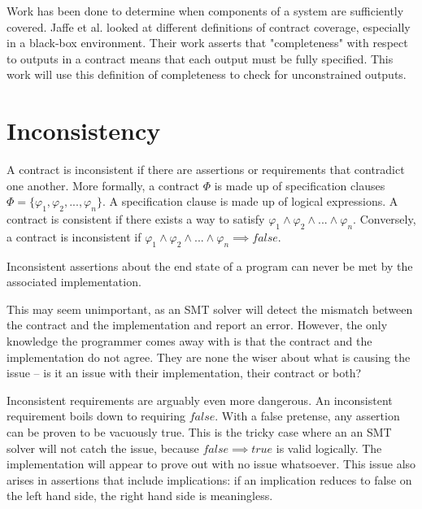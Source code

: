 \documentclass{article}
\newif\ifcomments
\newcommand{\egm}[1]{\ifcomments\textcolor{orange}{egm: #1}\fi}
\begin{document}
Work has been done to determine when components of a system are sufficiently covered. Jaffe et al. \cite{jaffe1989completeness}
looked at different definitions of contract coverage, especially in a black-box environment. Their work asserts that "completeness"
with respect to outputs in a contract means that each output must be fully specified. This work will use this definition of
completeness to check for unconstrained outputs.

\section{Inconsistency}

A contract is inconsistent if there are assertions or requirements that contradict one another. More formally, a
contract \(\Phi\) is made up of specification clauses \(\Phi = \{\varphi_{1}, \varphi_{2}, ..., \varphi_{n}\}\).
A specification clause is made up of logical expressions. A contract is consistent if there exists a way to satisfy
\(\varphi_{1} \land \varphi_{2} \land ... \land \varphi_{n} \). Conversely, a contract is inconsistent
if \(\varphi_{1} \land \varphi_{2} \land ... \land \varphi_{n} \implies false\).
\egm{It may be more clear using the term \emph{contradiction} from predicate logic---the opposite of a tautology. An inconsistent contract is a contradiction.}

Inconsistent assertions about the end state of a program can never be met by the associated implementation.
\egm{Prefer post-state to end state? I think post-state is what is used previously.}
This may seem unimportant, as an SMT solver will detect the mismatch between the contract and the implementation
and report an error. However, the only knowledge the programmer comes away with is that the contract and the
implementation do not agree. They are none the wiser about what is causing the issue – is it an issue
with their implementation, their contract or both?
\egm{Didn't we show that Dafny can prove anything about the post-state of a method in the presesnce of a post-condition that is a contradiction?}

Inconsistent requirements are arguably even more dangerous. An inconsistent requirement boils down to requiring
 \(false\). With a false pretense, any assertion can be proven to be vacuously true. This is the tricky case
 where an an SMT solver will not catch the issue, because \(false \implies true\) is valid logically. The implementation
 will appear to prove out with no issue whatsoever. This issue also arises in assertions that include implications: if
 an implication reduces to false on the left hand side, the right hand side is meaningless.
 \egm{Here it is worth noting that when the pre-condition is a contradiction, then the method/function cannot be called in any context since the pre-condition is always violated. That is a hint that something is amiss. But that aside, it's hard to figure out why the pre-condition cannot be satisfied, and looking for a contradiction is not the first think a developer things about.}
\end{document}
